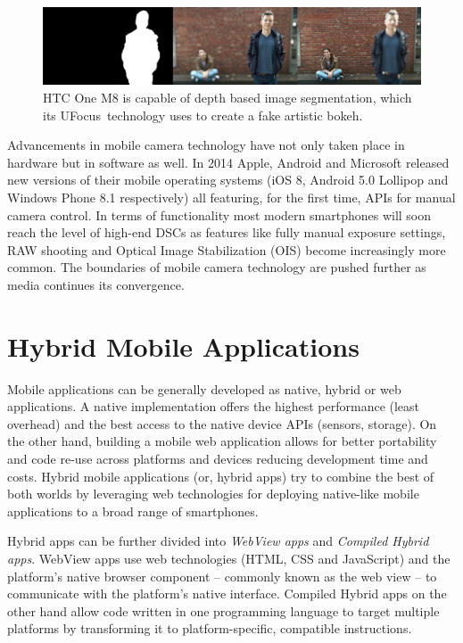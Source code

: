 \documentclass[thesis.tex]{subfiles}
\begin{document}
\begin{figure}[h]
\centering \includegraphics[width=\textwidth]{images/htc-ufocus.jpg}
\caption{HTC One M8 is capable of depth based image segmentation, which its UFocus\texttrademark\ technology uses to create a fake artistic bokeh.\label{figure:htc-ufocus} \cite{htc_one_ufocus}}
\end{figure}

Advancements in mobile camera technology have not only taken place in hardware but in software as well. In 2014 Apple, Android and Microsoft released new versions of their mobile operating systems (iOS 8, Android 5.0 Lollipop and Windows Phone 8.1 respectively) all featuring, for the first time, APIs for manual camera control. In terms of functionality most modern smartphones will soon reach the level of high-end DSCs as features like fully manual exposure settings, RAW shooting and Optical Image Stabilization (OIS) become increasingly more common. The boundaries of mobile camera technology are pushed further as media continues its convergence.

\section{Hybrid Mobile Applications}
\label{section:hybrid_mobile_landscape}

Mobile applications can be generally developed as native, hybrid or web applications. A native implementation offers the highest performance (least overhead) and the best access to the native device APIs (sensors, storage). On the other hand, building a mobile web application allows for better portability and code re-use across platforms and devices reducing development time and costs. Hybrid mobile applications (or, hybrid apps) try to combine the best of both worlds by leveraging web technologies for deploying native-like mobile applications to a broad range of smartphones.

Hybrid apps can be further divided into \textit{WebView apps} and \textit{Compiled Hybrid apps}. WebView apps use web technologies (HTML, CSS and JavaScript) and the platform's native browser component -- commonly known as the web view -- to communicate with the platform's native interface. Compiled Hybrid apps on the other hand allow code written in one programming language to target multiple platforms by transforming it to platform-specific, compatible instructions.
\end{document}
